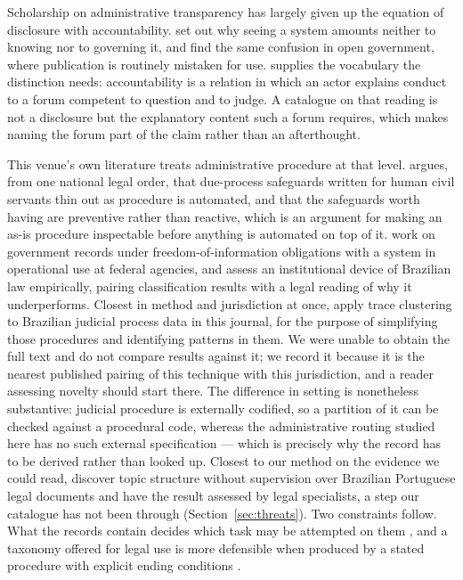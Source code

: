 Scholarship on administrative transparency has largely given up the equation of disclosure with
accountability. \citet{ananny2018seeing} set out why seeing a system amounts neither to knowing
nor to governing it, and \citet{janssen2012benefits} find the same confusion in open government,
where publication is routinely mistaken for use. \citet{bovens2007analysing} supplies the
vocabulary the distinction needs: accountability is a relation in which an actor explains conduct
to a forum competent to question and to judge. A catalogue on that reading is not a disclosure
but the explanatory content such a forum requires, which makes naming the forum part of the
claim rather than an afterthought.

This venue's own literature treats administrative procedure at that level.
\citet{suksi2021administrative} argues, from one national legal order, that due-process
safeguards written for human civil servants thin out as procedure is automated, and that the
safeguards worth having are preventive rather than reactive, which is an argument for making an
as-is procedure inspectable before anything is automated on top of it.
\citet{branting2025sensitive} work on government records under freedom-of-information
obligations with a system in operational use at federal agencies, and \citet{tinarrage2025empirical}
assess an institutional device of Brazilian law empirically, pairing classification results with a
legal reading of why it underperforms. Closest in method and jurisdiction at once, \citet{araujo2025trace} apply trace clustering to
Brazilian judicial process data in this journal, for the purpose of simplifying those
procedures and identifying patterns in them. We were unable to obtain the full text and do not
compare results against it; we record it because it is the nearest published pairing of this
technique with this jurisdiction, and a reader assessing novelty should start there. The
difference in setting is nonetheless substantive: judicial procedure is externally codified,
so a partition of it can be checked against a procedural code, whereas the administrative
routing studied here has no such external specification --- which is precisely why the record
has to be derived rather than looked up.
Closest to our method on the evidence we could read, \citet{vianna2024topic} discover
topic structure without supervision over Brazilian Portuguese legal documents and have the
result assessed by legal specialists, a step our catalogue has not been through
(Section~\ref{sec:threats}). Two constraints follow. What the records contain decides which task
may be attempted on them \citep{medvedeva2023rethinking}, and a taxonomy offered for legal use
is more defensible when produced by a stated procedure with explicit ending conditions
\citep{nickerson2013taxonomy}.
